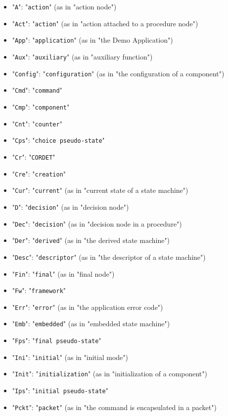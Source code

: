 \documentclass{pnp_article}
\begin{document}
\begin{itemize}
\item "\texttt{A}": "\texttt{action}" (as in "action node")
\item "\texttt{Act}": "\texttt{action}" (as in "action attached to a procedure node")
\item "\texttt{App}": "\texttt{application}" (as in "the Demo Application")
\item "\texttt{Aux}": "\texttt{auxiliary}" (as in "auxiliary function")
\item "\texttt{Config}": "\texttt{configuration}" (as in "the configuration of a component")
\item "\texttt{Cmd}": "\texttt{command}"
\item "\texttt{Cmp}": "\texttt{component}"
\item "\texttt{Cnt}": "\texttt{counter}"
\item "\texttt{Cps}": "\texttt{choice pseudo-state}"
\item "\texttt{Cr}": "\texttt{CORDET}" 
\item "\texttt{Cre}": "\texttt{creation}" 
\item "\texttt{Cur}": "\texttt{current}" (as in "current state of a state machine")
\item "\texttt{D}": "\texttt{decision}" (as in "decision node")
\item "\texttt{Dec}": "\texttt{decision}" (as in "decision node in a procedure")
\item "\texttt{Der}": "\texttt{derived}" (as in "the derived state machine")
\item "\texttt{Desc}": "\texttt{descriptor}" (as in "the descriptor of a state machine")
\item "\texttt{Fin}": "\texttt{final}" (as in "final node")
\item "\texttt{Fw}": "\texttt{framework}" 
\item "\texttt{Err}": "\texttt{error}" (as in "the application error code")
\item "\texttt{Emb}": "\texttt{embedded}" (as in "embedded state machine")
\item "\texttt{Fps}": "\texttt{final pseudo-state}"
\item "\texttt{Ini}": "\texttt{initial}" (as in "initial mode")
\item "\texttt{Init}": "\texttt{initialization}" (as in "initialization of a component")
\item "\texttt{Ips}": "\texttt{initial pseudo-state}"
\item "\texttt{Pckt}": "\texttt{packet}" (as in "the command is encapsulated in a packet")

\end{itemize}
\end{document}
